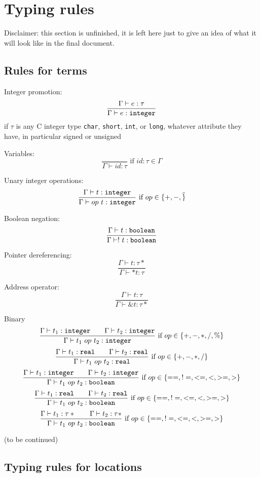 \section{Typing rules}
\label{sec:typingrules}

Disclaimer: this section is unfinished, it is left here just to give an idea of what it will look like in the final document.

\subsection{Rules for terms}

Integer promotion:
\[
\frac{\Gamma \vdash e : \tau}{\Gamma \vdash e : \texttt{integer}}
\]
if $\tau$ is any C integer type \verb|char|, \verb|short|, \verb|int|, or \verb|long|, whatever attribute they have, in particular signed or unsigned

Variables:
\[
\frac{}{\Gamma \vdash id : \tau} \mbox{ if $id:\tau\in\Gamma$}
\]

Unary integer operations:
\[
\frac{\Gamma \vdash t : \texttt{integer}}{\Gamma \vdash op~t : \texttt{integer}} \mbox{ if $op\in \{+,-,\tilde\}$}
\]

Boolean negation:
\[
\frac{\Gamma \vdash t : \texttt{boolean}}{\Gamma \vdash !~t : \texttt{boolean}}
\]

Pointer dereferencing:
\[
\frac{\Gamma \vdash t : \tau*}{\Gamma \vdash *t : \tau}
\]

Address operator:
\[
\frac{\Gamma \vdash t : \tau}{\Gamma \vdash \&t : \tau*}
\]

Binary
\[
\frac{\Gamma \vdash t_1 : \texttt{integer}\qquad\Gamma \vdash t_2 : \texttt{integer}}{\Gamma \vdash t_1~op~t_2 : \texttt{integer}} \mbox{ if $op\in \{+,-,*,/,\%\}$}
\]
\[
\frac{\Gamma \vdash t_1 : \texttt{real}\qquad\Gamma \vdash t_2 : \texttt{real}}{\Gamma \vdash t_1~op~t_2 : \texttt{real}} \mbox{ if $op\in \{+,-,*,/\}$}
\]
\[
\frac{\Gamma \vdash t_1 : \texttt{integer}\qquad\Gamma \vdash t_2 : \texttt{integer}}{\Gamma \vdash t_1~op~t_2 : \texttt{boolean}} \mbox{ if $op\in \{==,!=,<=,<,>=,>\}$}
\]
\[
\frac{\Gamma \vdash t_1 : \texttt{real}\qquad\Gamma \vdash t_2 : \texttt{real}}{\Gamma \vdash t_1~op~t_2 : \texttt{boolean}} \mbox{ if $op\in \{==,!=,<=,<,>=,>\}$}
\]
\[
\frac{\Gamma \vdash t_1 : \tau*\qquad\Gamma \vdash t_2 : \tau*}{\Gamma \vdash t_1~op~t_2 : \texttt{boolean}} \mbox{ if $op\in \{==,!=,<=,<,>=,>\}$}
\]

(to be continued)


\subsection{Typing rules for locations}

